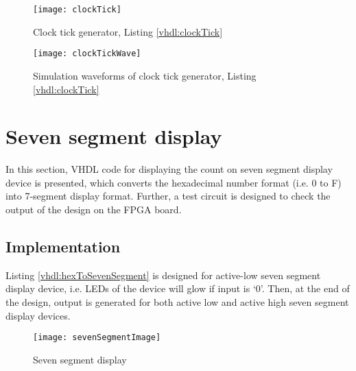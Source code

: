 

\begin{figure}[!h]
	\centering
	\texttt{[image: clockTick]}
	\caption{Clock tick generator, Listing \ref{vhdl:clockTick}}
	\label{fig:clockTick}
\end{figure}

\begin{figure}[!h]
	\centering
	\texttt{[image: clockTickWave]}
	\caption{Simulation waveforms of clock tick generator, Listing \ref{vhdl:clockTick}}
	\label{fig:clockTickWave}
\end{figure}

\section{Seven segment display} \label{sec:sevenSegmentDisplay}
In this section, VHDL code for displaying the count on seven segment display device is presented, which converts the hexadecimal number format (i.e. 0 to F) into 7-segment display format. Further, a test circuit is designed to check the output of the design on the FPGA board. 

\subsection{Implementation}

Listing \ref{vhdl:hexToSevenSegment} is designed for active-low seven segment display device, i.e. LEDs of the device will glow if input is `0'. Then, at the end of the design, output is generated for both active low and active high seven segment display devices. 

\begin{figure}[!h]
	\centering
	\texttt{[image: sevenSegmentImage]}
	\caption{Seven segment display}
	\label{fig:sevenSegmentImage}
\end{figure}


